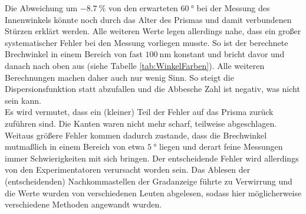 Die Abweichung um $\SI{-8.7}{\%}$ von den erwarteten $\SI{60}{\degree}$ bei der Messung des Innenwinkels könnte noch durch das Alter des Prismas und damit verbundenen Stürzen erklärt werden. Alle weiteren Werte legen allerdings nahe, dass ein großer systematischer Fehler bei den Messung vorliegen musste. So ist der berechnete Brechwinkel in einem Bereich von fast $\SI{100}{\nano\meter}$ konstant und bricht davor und danach nach oben aus (siehe Tabelle \ref{tab:WinkelFarben}). Alle weiteren Berechnungen machen daher auch nur wenig Sinn. So steigt die Dispersionsfunktion statt abzufallen und die Abbesche Zahl ist negativ, was nicht sein kann. \\
Es wird vermutet, dass ein (kleiner) Teil der Fehler auf das Prisma zurück zuführen sind. Die Kanten waren nicht mehr scharf, teilweise abgeschlagen. Weitaus größere Fehler kommen dadurch zustande, dass die Brechwinkel mutmaßlich in einem Bereich von etwa $\SI{5}{\degree}$ liegen und derart feine Messungen immer Schwierigkeiten mit sich bringen. Der entscheidende Fehler wird allerdings von den Experimentatoren verursacht worden sein. Das Ablesen der (entscheidenden) Nachkommastellen der Gradanzeige führte zu Verwirrung und die Werte wurden von verschiedenen Leuten abgelesen, sodass hier möglicherweise verschiedene Methoden angewandt wurden.